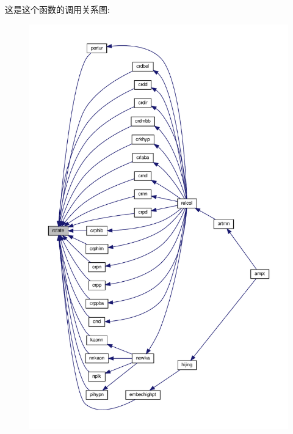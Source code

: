 这是这个函数的调用关系图\+:
\nopagebreak
\begin{figure}[H]
\begin{center}
\leavevmode
\includegraphics[width=350pt]{rotate_8f90_a3d502ab089e12b0819f9ebef1f5afd4c_icgraph}
\end{center}
\end{figure}
